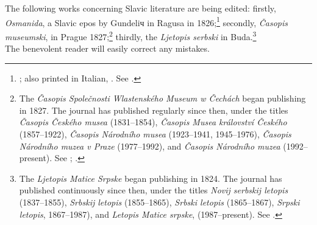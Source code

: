 The following works concerning Slavic literature are being edited: firstly, \textit{Osmanida}, a Slavic epos by Gundeliч in Ragusa in 1826;\footnote{\citet{gundulic_osmanida_1826}; also printed in Italian, \citet{gundulic_versione_1827}. See \citet{zlatar_slavic_1995}.} secondly, \textit{Časopis museumski}, in Prague 1827;\footnote{The \textit{Časopis Společnosti Wlastenského Museum w Čechách} began publishing in 1827. The journal has published regularly since then, under the titles \textit{Časopis Českého musea} (1831--1854), \textit{Časopis Musea království Českého} (1857--1922), \textit{Časopis Národního musea} (1923--1941, 1945--1976), \textit{Časopis Národního muzea v Praze} (1977--1992), and \textit{Časopis Národního muzea} (1992--present). See \citet[121--164]{spet_historie_1977}; \citet[5--26]{zlatar_slavic_1995}.} thirdly, the \textit{Ljetopis serbski} in Buda.\footnote{The \textit{Ljetopis Matice Srpske} began publishing in 1824. The journal has published continuously since then, under the titles \textit{Novij serbskij letopis} (1837--1855), \textit{Srbskij letopis} (1855--1865), \textit{Srbski letopis} (1865--1867), \textit{Srpski letopis}, 1867--1987), and \textit{Letopis Matice srpske}, (1987--present). See \citet[348--370]{kimball_serbian_1969}.} \\

The benevolent reader will easily correct any mistakes.